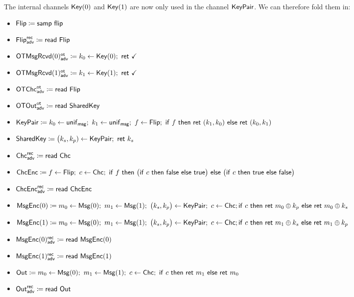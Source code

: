 \noindent The internal channels $\mathsf{Key}(0)$ and $\mathsf{Key}(1)$ are now only used in the channel $\mathsf{KeyPair}$. We can therefore fold them in:

\begin{itemize}
\item $\mathsf{Flip} \coloneqq \mathsf{samp} \ \mathsf{flip}$
\item {\color{blue} $\mathsf{Flip}^{\mathsf{rec}}_{\mathsf{adv}} \coloneqq \mathsf{read} \ \mathsf{Flip}$}
\item {\color{blue} $\LeakOTMsgRcvd(0)^\ot_\adv \coloneqq k_0 \leftarrow \Key(0); \ \ret{\checkmark}$}
\item {\color{blue} $\LeakOTMsgRcvd(1)^\ot_\adv \coloneqq k_1 \leftarrow \Key(1); \ \ret{\checkmark}$}
\item {\color{blue} $\mathsf{OTChc}^{\mathsf{ot}}_{\mathsf{adv}} \coloneqq \mathsf{read} \ \mathsf{Flip}$}
\item {\color{blue} $\mathsf{OTOut}^{\mathsf{ot}}_{\mathsf{adv}} \coloneqq \mathsf{read} \ \mathsf{SharedKey}$}
\item {\color{red} $\KeyPair \coloneqq k_0 \leftarrow \unif_\msg; \ k_1 \leftarrow \unif_\msg; \ f \leftarrow \Flip; \ \ifte{f}{\ret{(k_1,k_0)}}{\ret{(k_0,k_1)}}$}
\item $\mathsf{SharedKey} \coloneqq \big(k_s,k_p) \leftarrow \mathsf{KeyPair}; \ \mathsf{ret} \ k_s$
\item {\color{blue} $\mathsf{Chc}^{\mathsf{rec}}_{\mathsf{adv}} \coloneqq \mathsf{read} \ \mathsf{Chc}$}
\item $\ChcEnc \coloneqq f \leftarrow \Flip; \ c \leftarrow \Chc; \ \ifte{f}{\big(\ifte{c}{\false}{\true}\big)}{\big(\ifte{c}{\true}{\false}\big)}$
\item {\color{blue} $\mathsf{ChcEnc}^{\mathsf{rec}}_{\mathsf{adv}} \coloneqq \mathsf{read} \ \mathsf{ChcEnc}$}
\item $\mathsf{MsgEnc}(0) \coloneqq m_0 \leftarrow \mathsf{Msg}(0); \ m_1 \leftarrow \mathsf{Msg}(1); \ \big(k_s,k_p\big) \leftarrow \mathsf{KeyPair}; \ c \leftarrow \mathsf{Chc}; \\ \mathsf{if} \ c \ \mathsf{then} \ \mathsf{ret} \ m_0 \oplus k_p \ \mathsf{else} \ \mathsf{ret} \ m_0 \oplus k_s$
\item $\mathsf{MsgEnc}(1) \coloneqq m_0 \leftarrow \mathsf{Msg}(0); \ m_1 \leftarrow \mathsf{Msg}(1); \ \big(k_s,k_p\big) \leftarrow \mathsf{KeyPair}; \ c \leftarrow \mathsf{Chc}; \\ \mathsf{if} \ c \ \mathsf{then} \ \mathsf{ret} \ m_1 \oplus k_s \ \mathsf{else} \ \mathsf{ret} \ m_1 \oplus k_p$
\item {\color{blue} $\mathsf{MsgEnc}(0)^{\mathsf{rec}}_{\mathsf{adv}} \coloneqq \mathsf{read} \ \mathsf{MsgEnc}(0)$}
\item {\color{blue} $\mathsf{MsgEnc}(1)^{\mathsf{rec}}_{\mathsf{adv}} \coloneqq \mathsf{read} \ \mathsf{MsgEnc}(1)$}
\item $\Out \coloneqq m_0 \leftarrow \Msg(0); \ m_1 \leftarrow \Msg(1); \ c \leftarrow \Chc; \ \ifte{c}{\ret{m_1}}{\ret{m_0}}$
\item {\color{blue} $\mathsf{Out}^{\mathsf{rec}}_{\mathsf{adv}} \coloneqq \mathsf{read} \ \mathsf{Out}$}
\end{itemize}

